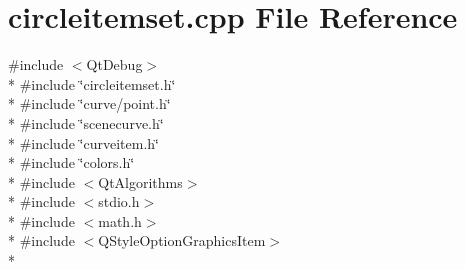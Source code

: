 \section{circleitemset.\+cpp File Reference}
\label{bk3_2curve_2painters_2circleitemset_8cpp}
{\ttfamily \#include $<$Qt\+Debug$>$}\\*
{\ttfamily \#include \char`\"{}circleitemset.\+h\char`\"{}}\\*
{\ttfamily \#include \char`\"{}curve/point.\+h\char`\"{}}\\*
{\ttfamily \#include \char`\"{}scenecurve.\+h\char`\"{}}\\*
{\ttfamily \#include \char`\"{}curveitem.\+h\char`\"{}}\\*
{\ttfamily \#include \char`\"{}colors.\+h\char`\"{}}\\*
{\ttfamily \#include $<$Qt\+Algorithms$>$}\\*
{\ttfamily \#include $<$stdio.\+h$>$}\\*
{\ttfamily \#include $<$math.\+h$>$}\\*
{\ttfamily \#include $<$Q\+Style\+Option\+Graphics\+Item$>$}\\*

